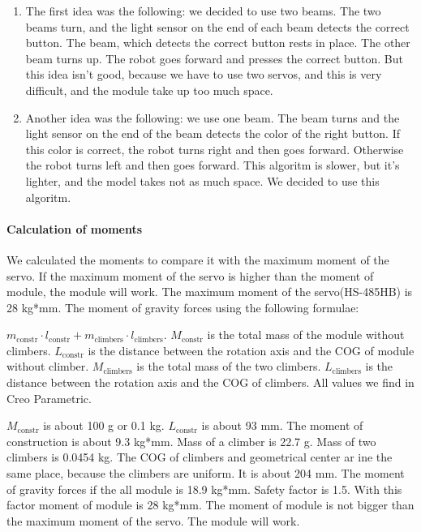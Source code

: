 	\begin{enumerate}	
		\item The first idea was the following: we decided to use two beams. The two beams turn, and the light sensor on the end of each beam detects the correct button. The beam, which detects the correct button rests in place. The other beam turns up. The robot goes forward and presses the correct button. But this idea isn't good, because we have to use two servos, and this is very difficult, and the module take up too much space.
	
		\item Another idea was the following: we use one beam. The beam turns and the light sensor on the end of the beam detects the color of the right button. If this color is correct, the robot turns right and then goes forward. Otherwise the robot turns left and then goes forward. This algoritm is slower, but it's lighter, and the model takes not as much space. We decided to use this algoritm.
	\end{enumerate}
	
	\paragraph{Calculation of moments}
	
	We calculated the moments to compare it with the maximum moment of the servo. If the maximum moment of the servo is higher than the moment of module, the module will work. The maximum moment of the servo(HS-485HB) is 28 kg*mm. The moment of gravity forces using the following formulae: 
	
	$m_\text{constr} \cdot l_\text{constr} + m_\text{climbers} \cdot l_\text{climbers}$.	
	 $M_\text{constr}$ is the total mass of the module without climbers. $L_\text{constr}$ is the distance between the rotation axis and the COG of module without climber. $M_\text{climbers}$ is the total mass of the two climbers. $L_\text{climbers}$ is the distance between the rotation axis and the COG of climbers. All values we find in Creo Parametric.
	 
	 $M_\text{constr}$ is about 100 g or 0.1 kg. $L_\text{constr}$ is about 93 mm. The moment of construction is about 9.3 kg*mm. Mass of a climber is 22.7 g. Mass of two climbers is 0.0454 kg. The COG of climbers and geometrical center ar ine the same place, because the climbers are uniform. It is about 204 mm. The moment of gravity forces if the all module is 18.9 kg*mm. Safety factor is 1.5. With this factor moment of module is 28 kg*mm. The moment of module is not bigger than the maximum moment of the servo. The module will work.
	 
